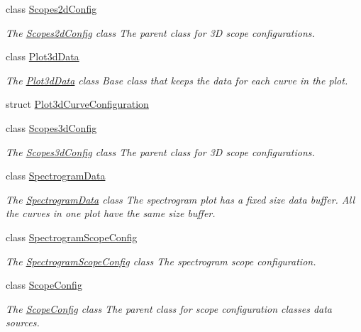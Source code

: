 \begin{DoxyCompactItemize}
\item 
class \hyperlink{class_scopes2d_config}{\-Scopes2d\-Config}
\begin{DoxyCompactList}\small\item\em \-The \hyperlink{class_scopes2d_config}{\-Scopes2d\-Config} class \-The parent class for 3\-D scope configurations. \end{DoxyCompactList}\item 
class \hyperlink{class_plot3d_data}{\-Plot3d\-Data}
\begin{DoxyCompactList}\small\item\em \-The \hyperlink{class_plot3d_data}{\-Plot3d\-Data} class \-Base class that keeps the data for each curve in the plot. \end{DoxyCompactList}\item 
struct \hyperlink{struct_plot3d_curve_configuration}{\-Plot3d\-Curve\-Configuration}
\item 
class \hyperlink{class_scopes3d_config}{\-Scopes3d\-Config}
\begin{DoxyCompactList}\small\item\em \-The \hyperlink{class_scopes3d_config}{\-Scopes3d\-Config} class \-The parent class for 3\-D scope configurations. \end{DoxyCompactList}\item 
class \hyperlink{class_spectrogram_data}{\-Spectrogram\-Data}
\begin{DoxyCompactList}\small\item\em \-The \hyperlink{class_spectrogram_data}{\-Spectrogram\-Data} class \-The spectrogram plot has a fixed size data buffer. \-All the curves in one plot have the same size buffer. \end{DoxyCompactList}\item 
class \hyperlink{class_spectrogram_scope_config}{\-Spectrogram\-Scope\-Config}
\begin{DoxyCompactList}\small\item\em \-The \hyperlink{class_spectrogram_scope_config}{\-Spectrogram\-Scope\-Config} class \-The spectrogram scope configuration. \end{DoxyCompactList}\item 
class \hyperlink{class_scope_config}{\-Scope\-Config}
\begin{DoxyCompactList}\small\item\em \-The \hyperlink{class_scope_config}{\-Scope\-Config} class \-The parent class for scope configuration classes data sources. \end{DoxyCompactList}\end{DoxyCompactItemize}
